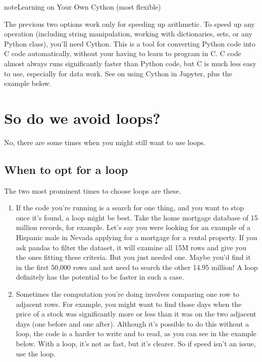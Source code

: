 \documentclass[letterpaper,10pt,english]{jupyterBook}
\begin{document}
\begin{sphinxadmonition}{note}{Learning on Your Own \sphinxhyphen{} Cython (most flexible)}

\sphinxAtStartPar
The previous two options work only for speeding up arithmetic.  To speed up any operation (including string manipulation, working with dictionaries, sets, or any Python class), you’ll need Cython.  This is a tool for converting Python code into C code automatically, without your having to learn to program in C.  C code almost always runs significantly faster than Python code, but C is much less easy to use, especially for data work.  See  on using Cython in Jupyter, plus the example below.
\end{sphinxadmonition}


\section{So do we  avoid loops?}
\label{\detokenize{chapter-11-processing-rows:so-do-we-always-avoid-loops}}
\sphinxAtStartPar
No, there are some times when you might still want to use loops.


\subsection{When to opt for a loop}
\label{\detokenize{chapter-11-processing-rows:when-to-opt-for-a-loop}}
\sphinxAtStartPar
The two most prominent times to choose loops are these.
\begin{enumerate}
%
\item {} 
\sphinxAtStartPar
If the code you’re running is a search for one thing, and you want to stop once it’s found, a loop might be best.  Take the home mortgage database of 15 million records, for example.  Let’s say you were looking for an example of a Hispanic male in Nevada applying for a mortgage for a rental property.  If you ask pandas to filter the dataset, it will examine all 15M rows and give you  the ones fitting these criteria.  But you just needed one.  Maybe you’d find it in the first 50,000 rows and not need to search the other 14.95 million!  A loop definitely has the potential to be faster in such a case.

\item {} 
\sphinxAtStartPar
Sometimes the computation you’re doing involves comparing one row to adjacent rows.  For example, you might want to find those days when the price of a stock was significantly more or less than it was on the two adjacent days (one before and one after).  Although it’s possible to do this without a loop, the code is a harder to write and to read, as you can see in the example below.  With a loop, it’s not as fast, but it’s clearer.  So if speed isn’t an issue, use the loop.

\end{enumerate}
\end{document}
